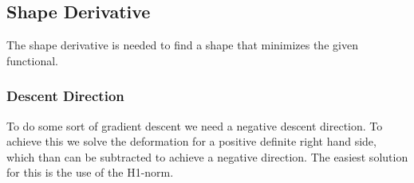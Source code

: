 \subsection{Shape Derivative}
The shape derivative is needed to find a shape that minimizes the given functional.

\subsubsection{Descent Direction}
To do some sort of gradient descent we need a negative descent direction. To achieve this we solve the deformation for a positive definite right hand side, which than can be subtracted to achieve a negative direction.
The easiest solution for this is the use of the H1-norm.